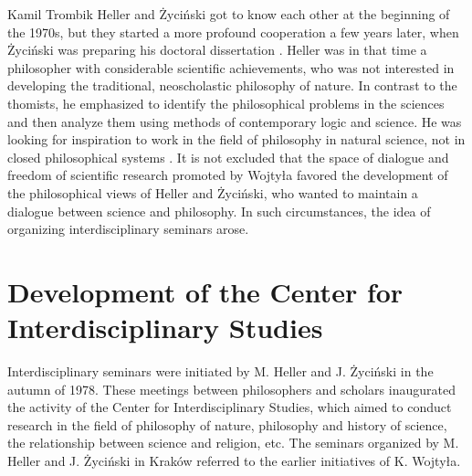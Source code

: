 \begin{artengenv}{Kamil Trombik}
Heller and Życiński got to know each other at the beginning of the 1970s, but they started a more profound cooperation a
few years later, when Życiński was preparing his doctoral dissertation
\parencite[p.230]{heller_wierze_2016}.
Heller was in that time a philosopher with considerable scientific achievements, who was not interested in
developing the traditional, neoscholastic philosophy of nature. In contrast to the thomists, he emphasized to identify
the philosophical problems in the sciences and then analyze them using methods of contemporary logic and science. He
was looking for inspiration to work in the field of philosophy in natural science, not in closed philosophical systems
\parencite{polak_philosophy_2019}.
It is not excluded that the space of dialogue and freedom of scientific
research promoted by Wojtyła favored the development of the philosophical views of Heller and Życiński, who wanted to
maintain a dialogue between science and philosophy. In such circumstances, the idea of organizing interdisciplinary
seminars arose.

\section{Development of the Center for Interdisciplinary Studies}

Interdisciplinary seminars were initiated by M. Heller and J. Życiński in the autumn of 1978. These meetings between
philosophers and scholars inaugurated the activity of the Center for Interdisciplinary Studies, which aimed to conduct
research in the field of philosophy of nature, philosophy and history of science, the relationship between science and
religion, etc. The seminars organized by M. Heller and J. Życiński in Kraków referred to the earlier initiatives of K.
Wojtyła.


\end{artengenv}
